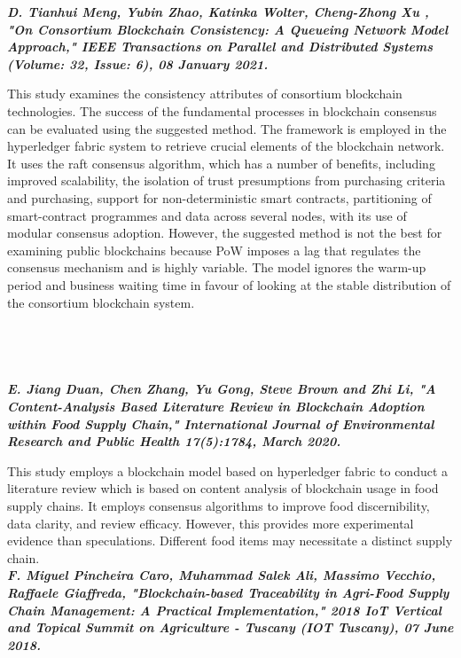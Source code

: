 \documentclass[12pt,a4paper,twocolumn,fleqn]{article}
\begin{document}
\textbf{\emph {D. Tianhui Meng, Yubin Zhao, Katinka Wolter, Cheng-Zhong Xu , "On Consortium Blockchain Consistency: A Queueing Network Model Approach," IEEE Transactions on Parallel and Distributed Systems (Volume: 32, Issue: 6), 08 January 2021.}}

This study examines the consistency attributes of consortium blockchain technologies. The success of the fundamental processes in blockchain consensus can be evaluated using the suggested method. The framework is employed in the hyperledger fabric system to retrieve crucial elements of the blockchain network. It uses the raft consensus algorithm, which has a number of benefits, including improved scalability, the isolation of trust presumptions from purchasing criteria and purchasing, support for non-deterministic smart contracts, partitioning of smart-contract programmes and data across several nodes, with its use of modular consensus adoption. However, the suggested method is not the best for examining public blockchains because PoW imposes a lag that regulates the consensus mechanism and is highly variable. The model ignores the warm-up period and business waiting time in favour of looking at the stable distribution of the consortium blockchain system. \\ \\ \\ \\ \\

\textbf{\emph {E. Jiang Duan, Chen Zhang, Yu Gong, Steve Brown and Zhi Li, "A Content-Analysis Based Literature Review in Blockchain Adoption within Food Supply Chain," International Journal of Environmental Research and Public Health 17(5):1784, March 2020.}}

This study employs a blockchain model based on hyperledger fabric to conduct a literature review which is based on content analysis of blockchain usage in food supply chains. It employs consensus algorithms to improve food discernibility, data clarity, and review efficacy. However, this provides more experimental evidence than speculations. Different food items may necessitate a distinct supply chain. \\

\textbf{\emph {F. Miguel Pincheira Caro, Muhammad Salek Ali, Massimo Vecchio, Raffaele Giaffreda, "Blockchain-based Traceability in Agri-Food Supply Chain Management: A Practical Implementation," 2018 IoT Vertical and Topical Summit on Agriculture - Tuscany (IOT Tuscany), 07 June 2018.}}
\end{document}
